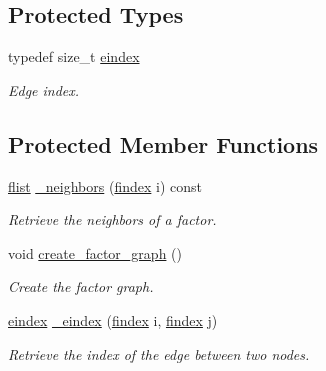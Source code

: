 \subsection*{Protected Types}
\begin{DoxyCompactItemize}
\item 
typedef size\+\_\+t \hyperlink{classmerlin_1_1factor__graph_abec36f1f1a6ff2c0bfb74299851f9722}{eindex}\hypertarget{classmerlin_1_1factor__graph_abec36f1f1a6ff2c0bfb74299851f9722}{}\label{classmerlin_1_1factor__graph_abec36f1f1a6ff2c0bfb74299851f9722}

\begin{DoxyCompactList}\small\item\em Edge index. \end{DoxyCompactList}\end{DoxyCompactItemize}
\subsection*{Protected Member Functions}
\begin{DoxyCompactItemize}
\item 
\hyperlink{classmerlin_1_1factor__graph_a48dec4ea8a655315053984a81fe93ebc}{flist} \hyperlink{classmerlin_1_1factor__graph_a54f75765bae775dfa08f0ba4b022ea87}{\+\_\+neighbors} (\hyperlink{classmerlin_1_1factor__graph_a533556bd4ec6961b63a91a80a8a37508}{findex} i) const 
\begin{DoxyCompactList}\small\item\em Retrieve the neighbors of a factor. \end{DoxyCompactList}\item 
void \hyperlink{classmerlin_1_1factor__graph_ab9e0014c667318cdfe9454dc6bb3bf8a}{create\+\_\+factor\+\_\+graph} ()
\begin{DoxyCompactList}\small\item\em Create the factor graph. \end{DoxyCompactList}\item 
\hyperlink{classmerlin_1_1factor__graph_abec36f1f1a6ff2c0bfb74299851f9722}{eindex} \hyperlink{classmerlin_1_1factor__graph_ad167336dbf3fa30cfb4844c3d4fd1a37}{\+\_\+eindex} (\hyperlink{classmerlin_1_1factor__graph_a533556bd4ec6961b63a91a80a8a37508}{findex} i, \hyperlink{classmerlin_1_1factor__graph_a533556bd4ec6961b63a91a80a8a37508}{findex} j)
\begin{DoxyCompactList}\small\item\em Retrieve the index of the edge between two nodes. \end{DoxyCompactList}\end{DoxyCompactItemize}
